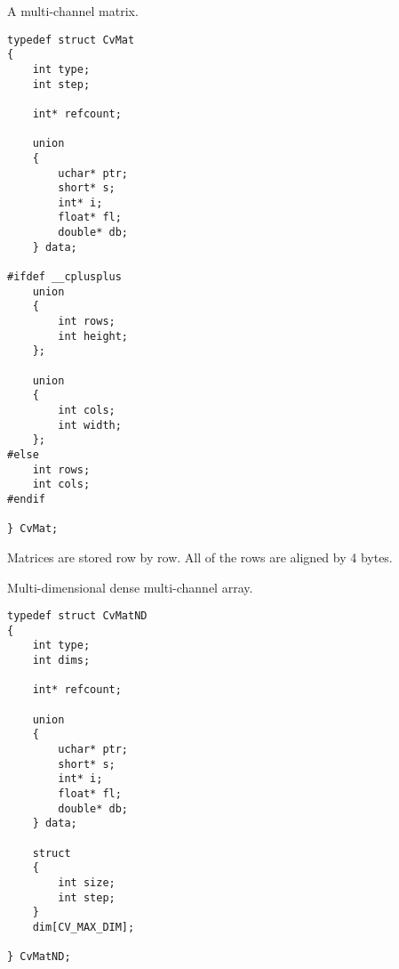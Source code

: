 \begin{description}
\end{description}

\fi %

\label{CvMat}
A multi-channel matrix.

\begin{lstlisting}
typedef struct CvMat
{
    int type; 
    int step; 

    int* refcount; 

    union
    {
        uchar* ptr;
        short* s;
        int* i;
        float* fl;
        double* db;
    } data; 

#ifdef __cplusplus
    union
    {
        int rows;
        int height;
    };

    union
    {
        int cols;
        int width;
    };
#else
    int rows; 
    int cols; 
#endif

} CvMat;
\end{lstlisting}

\begin{description}
\end{description}

Matrices are stored row by row. All of the rows are aligned by 4 bytes.


\label{CvMatND}
Multi-dimensional dense multi-channel array.

\begin{lstlisting}
typedef struct CvMatND
{
    int type; 
    int dims;

    int* refcount; 

    union
    {
        uchar* ptr;
        short* s;
        int* i;
        float* fl;
        double* db;
    } data; 

    struct
    {
        int size;
        int step;
    }
    dim[CV_MAX_DIM];

} CvMatND;
\end{lstlisting}

\begin{description}
\end{description}

